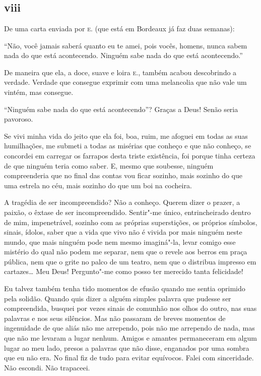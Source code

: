\chapter*{}
\section{viii}

\noindent{}De uma carta enviada por \textsc{e.} (que está em Bordeaux já faz duas semanas):

``Não, você jamais saberá quanto eu te amei, pois vocês, homens, nunca
sabem nada do que está acontecendo. Ninguém sabe nada do que está
acontecendo.''

De maneira que ela, a doce, suave e loira \textsc{e.}, também acabou
descobrindo a verdade. Verdade que consegue exprimir com uma
melancolia que não vale um vintém, mas consegue.

``Ninguém sabe nada do que está acontecendo''? Graças a Deus! Senão
seria pavoroso.

Se vivi minha vida do jeito que ela foi, boa, ruim, me
afoguei em todas as suas humilhações, me submeti a todas as
misérias que conheço e que não conheço, se concordei em carregar os
farrapos desta triste existência, foi porque tinha certeza de que
ninguém teria como saber. E, mesmo que soubesse, ninguém
compreenderia que no final das contas vou ficar sozinho, mais sozinho
do que uma estrela no céu, mais sozinho do que um boi na cocheira.

A tragédia de ser incompreendido? Não a conheço. Querem dizer o prazer,
a paixão, o êxtase de ser incompreendido. Sentir"-me único,
entrincheirado dentro de mim, impenetrável, sozinho com as próprias
superstições, os próprios símbolos, sinais, ídolos, saber que a vida
que vivo não é vivida por mais ninguém neste mundo, que mais ninguém
pode nem mesmo imaginá"-la, levar comigo esse mistério do qual não podem
me separar, nem que o revele aos berros em praça pública, nem que
o grite no palco de um teatro, nem que o distribua impresso em
cartazes\ldots{} Meu Deus! Pergunto"-me como posso ter merecido tanta
felicidade!

Eu talvez também tenha tido momentos de efusão quando me sentia
oprimido pela solidão. Quando quis dizer a alguém simples palavra
que pudesse ser compreendida, busquei por vezes sinais de
comunhão nos olhos do outro, nas suas palavras e nos seus silêncios. Mas
não passaram de breves momentos de ingenuidade de que aliás não me
arrependo, pois não me arrependo de nada, mas que não me levaram a lugar
nenhum. Amigos e amantes permaneceram em algum lugar ao meu lado, presos
a palavras que não disse, enganados por uma sombra que eu não era. No
final fiz de tudo para evitar equívocos. Falei com sinceridade. Não
escondi. Não trapaceei.

